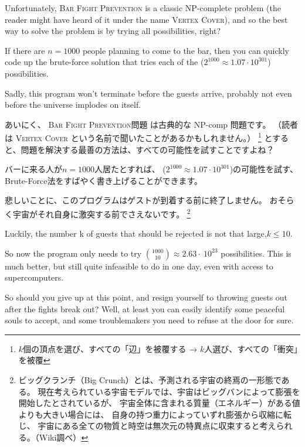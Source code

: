 \documentclass{jsarticle}
\begin{document}
\begin{screen}
Unfortunately, \textsc{Bar Fight Prevention} is a classic NP-complete problem (the reader might have heard of it under the name \textsc{Vertex Cover}), 
and so the best way to solve the problem is by trying all possibilities, right?

If there are $n=1000$ people planning to come to the bar, then you can quickly code up the brute-force solution that tries each of the ($2^{1000} \approx 1.07 \cdot 10^{301}$) possibilities.

Sadly, this program won’t terminate before the guests arrive, 
probably not even before the universe implodes on itself. 
\end{screen}


あいにく、 \textsc{Bar Fight Prevention}問題 は古典的な NP-comp 問題です。
（読者は \textsc{Vertex Cover} という名前で聞いたことがあるかもしれません。）
\footnote{$k$個の頂点を選び、すべての「辺」を被覆する → $k$人選び、すべての「衝突」を被覆}
とすると、問題を解決する最善の方法は、すべての可能性を試すことですよね？

バーに来る人が$n=1000$人居たとすれば、
($2^{1000} \approx 1.07 \cdot 10^{301}$)の可能性を試す、
Brute-Force法をすばやく書き上げることができます。

悲しいことに、このプログラムはゲストが到着する前に終了しません。
おそらく宇宙がそれ自身に激突する前でさえないです。
\footnote{ビッグクランチ（Big Crunch）とは、予測される宇宙の終焉の一形態である。
現在考えられている宇宙モデルでは、宇宙はビッグバンによって膨張を開始したとされているが、
宇宙全体に含まれる質量（エネルギー）がある値よりも大きい場合には、
自身の持つ重力によっていずれ膨張から収縮に転じ、
宇宙にある全ての物質と時空は無次元の特異点に収束すると考えられる。（Wiki調べ）}

\begin{screen}
    Luckily, the number k of guests that should be rejected is not that large,$k \leq 10$.

    So now the program only needs to try $\binom{1000}{10} \approx 2.63 \cdot\ 10^{23}$ possibilities. 
    This is much better, but still quite infeasible to do in one day, even with access to supercomputers.

    So should you give up at this point, 
    and resign yourself to throwing guests out after the fights break out?
    Well, at least you can easily identify some peaceful souls to accept, and some troublemakers you need to refuse at the door for sure.     
\end{screen}
\end{document}
